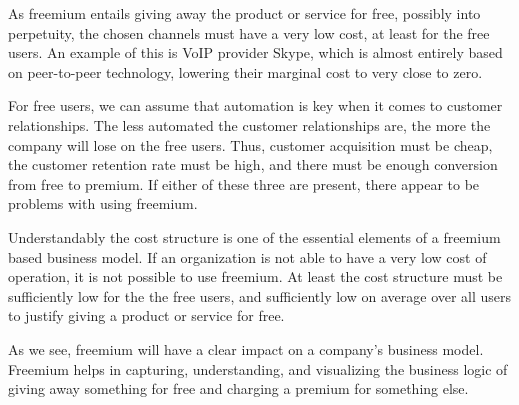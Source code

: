 As freemium entails giving away the product or service for free, possibly into perpetuity, the chosen channels must have a very low cost, at least for the free users. An example of this is VoIP provider Skype, which is almost entirely based on peer-to-peer technology, lowering their marginal cost to very close to zero.

For free users, we can assume that automation is key when it comes to customer relationships. The less automated the customer relationships are, the more the company will lose on the free users. Thus, customer acquisition must be cheap, the customer retention rate must be high, and there must be enough conversion from free to premium. If either of these three are present, there appear to be problems with using freemium. 

Understandably the cost structure is one of the essential elements of a freemium based business model. If an organization is not able to have a very low cost of operation, it is not possible to use freemium. At least the cost structure must be sufficiently low for the the free users, and sufficiently low on average over all users to justify giving a product or service for free.

As we see, freemium will have a clear impact on a company's business model. Freemium helps in capturing, understanding, and visualizing the business logic of giving away something for free and charging a premium for something else.
